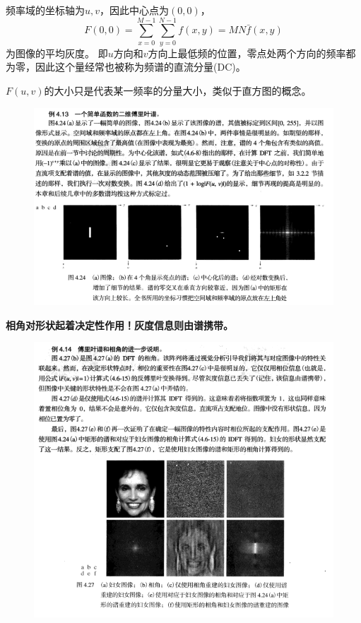 频率域的坐标轴为$u,v$，因此中心点为$(0,0)$，
\[F(0,0)=\sum_{x=0}^{M-1}\sum_{y=0}^{N-1}f(x,y)=MN\bar{f}(x,y)\]
为图像的平均灰度。
即$u$方向和$v$方向上最低频的位置，零点处两个方向的频率都为零，因此这个量经常也被称为频谱的直流分量(DC)。

$F(u,v)$的大小只是代表某一频率的分量大小，类似于直方图的概念。

\begin{figure}[H]
\centering
\includegraphics[width=\linewidth]{fig/fourier_spectrum.png}
\end{figure}

\textbf{相角对形状起着决定性作用！灰度信息则由谱携带。}
\begin{figure}[H]
\centering
\includegraphics[width=\linewidth]{fig/spectrum_angle_example.png}
\end{figure}

